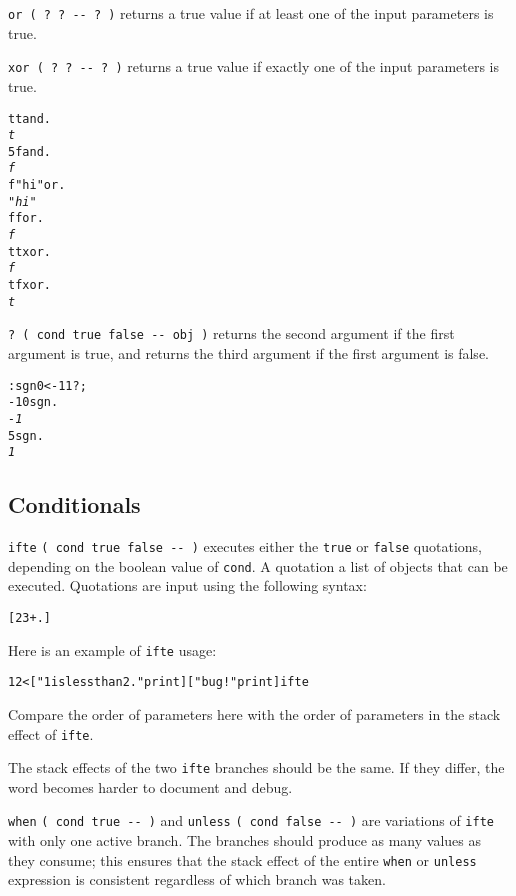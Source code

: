 \documentclass[english]{article}
\begin{document}
\texttt{or ( ?~?~-{}- ?~)} returns a true value if at least one of the input parameters is true.

\texttt{xor ( ?~?~-{}- ?~)} returns a true value if exactly one of the input parameters is true.

\begin{alltt}
t t and .
\emph{t}
5 f and .
\emph{f}
f "hi" or .
\emph{"hi"}
f f or .
\emph{f}
t t xor .
\emph{f}
t f xor .
\emph{t}
\end{alltt}

\texttt{?~( cond~true false -{}- obj~)} returns the second argument if the first argument is true, and returns the third argument if the first argument is false.

\begin{alltt}
: sgn 0 < -1 1 ? ;
-10 sgn .
\emph{-1}
5 sgn .
\emph{1}
\end{alltt}

\subsection{\label{sub:Conditionals}Conditionals}

\texttt{ifte} \texttt{( cond true false -{}- )} executes either the
\texttt{true} or \texttt{false} quotations, depending on the boolean
value of \texttt{cond}. A quotation a list of objects that can be executed. Quotations are input
using the following syntax:

\begin{alltt}
{[} 2 3 + . {]}
\end{alltt}

Here is an example of \texttt{ifte} usage:

\begin{alltt}
1 2 < {[} "1 is less than 2." print {]} {[} "bug!" print {]} ifte
\end{alltt}

Compare the order of parameters here with the order of parameters in
the stack effect of \texttt{ifte}.

The stack effects of the two \texttt{ifte} branches should be
the same. If they differ, the word becomes harder to document and
debug.

\texttt{when} \texttt{( cond true -{}- )} and \texttt{unless} \texttt{( cond false -{}- )} are variations of \texttt{ifte} with only one active branch. The branches should produce as many values as they consume; this ensures that the stack effect of the entire \texttt{when} or \texttt{unless} expression is consistent regardless of which branch was taken.
\end{document}
